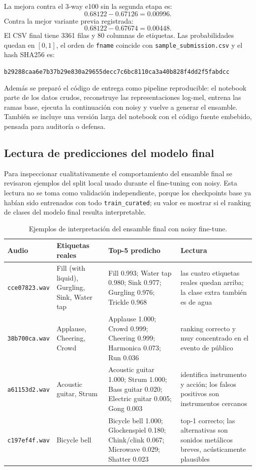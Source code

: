 \documentclass[10pt]{article}
\begin{document}
La mejora contra el 3-way e100 sin la segunda etapa es:
\[
0.68122 - 0.67126 = 0.00996.
\]
Contra la mejor variante previa registrada:
\[
0.68122 - 0.67674 = 0.00448.
\]
El CSV final tiene 3361 filas y 80 columnas de etiquetas. Las probabilidades
quedan en \([0,1]\), el orden de \texttt{fname} coincide con
\texttt{sample\_submission.csv} y el hash SHA256 es:
\begin{center}
\small\texttt{b29288caa6e7b37b29e830a29655decc7c6bc8110ca3a40b828f4dd2f5fabdcc}
\end{center}

Además se preparó el código de entrega como pipeline reproducible: el notebook
parte de los datos crudos, reconstruye las representaciones log-mel, entrena las
ramas base, ejecuta la continuación con noisy y vuelve a generar el ensamble.
También se incluye una versión larga del notebook con el código fuente embebido,
pensada para auditoría o defensa.

\subsection{Lectura de predicciones del modelo final}
Para inspeccionar cualitativamente el comportamiento del ensamble final se
revisaron ejemplos del split local usado durante el fine-tuning con noisy. Esta
lectura no se toma como validación independiente, porque los checkpoints base ya
habían sido entrenados con todo \texttt{train\_curated}; su valor es mostrar si
el ranking de clases del modelo final resulta interpretable.

\begin{table}[H]
\centering
\scriptsize
\begin{tabularx}{\textwidth}{@{}lX X X@{}}
\toprule
Audio & Etiquetas reales & Top-5 predicho & Lectura \\
\midrule
\texttt{cce07823.wav} &
Fill (with liquid), Gurgling, Sink, Water tap &
Fill 0.993; Water tap 0.980; Sink 0.977; Gurgling 0.976; Trickle 0.968 &
las cuatro etiquetas reales quedan arriba; la clase extra también es de agua \\
\texttt{38b700ca.wav} &
Applause, Cheering, Crowd &
Applause 1.000; Crowd 0.999; Cheering 0.999; Harmonica 0.073; Run 0.036 &
ranking correcto y muy concentrado en el evento de público \\
\texttt{a61153d2.wav} &
Acoustic guitar, Strum &
Acoustic guitar 1.000; Strum 1.000; Bass guitar 0.020; Electric guitar 0.005; Gong 0.003 &
identifica instrumento y acción; los falsos positivos son instrumentos cercanos \\
\texttt{c197ef4f.wav} &
Bicycle bell &
Bicycle bell 1.000; Glockenspiel 0.180; Chink/clink 0.067; Microwave 0.029; Shatter 0.023 &
top-1 correcto; las alternativas son sonidos metálicos breves, acústicamente plausibles \\
\bottomrule
\end{tabularx}
\caption{Ejemplos de interpretación del ensamble final con noisy fine-tune.}
\label{tab:interpretacion-final}
\end{table}
\end{document}
